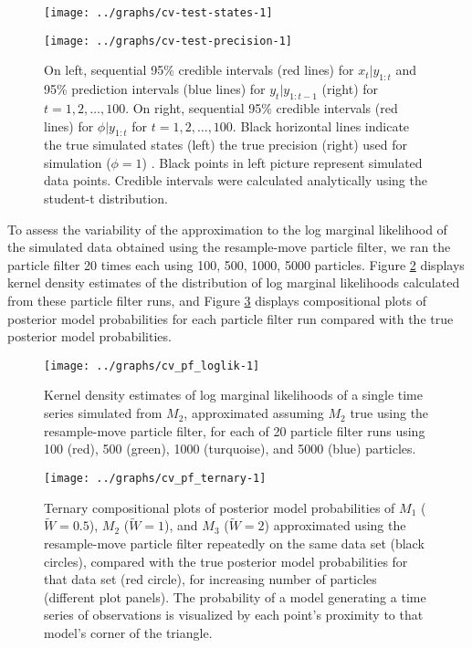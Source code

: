 \documentclass{article}
\begin{document}
\begin{figure}
\begin{minipage}{0.5\textwidth}
\texttt{[image: ../graphs/cv-test-states-1]}
\end{minipage}
\begin{minipage}{0.5\textwidth}
\texttt{[image: ../graphs/cv-test-precision-1]}
\end{minipage}
\caption{On left, sequential 95\% credible intervals (red lines) for $x_t|y_{1:t}$ and 95\% prediction intervals (blue lines) for $y_t|y_{1:t-1}$ (right) for $t = 1, 2, \ldots, 100$. On right, sequential 95\% credible intervals (red lines) for $\phi|y_{1:t}$ for $t = 1, 2, \ldots, 100$. Black horizontal lines indicate the true simulated states (left) the true precision (right) used for simulation ($\phi = 1$) . Black points in left picture represent simulated data points. Credible intervals were calculated analytically using the student-t distribution.} \label{fig:sim}
\end{figure}

To assess the variability of the approximation to the log marginal likelihood of the simulated data obtained using the resample-move particle filter, we ran the particle filter 20 times each using 100, 500, 1000, 5000 particles. Figure \ref{fig:pf-hist} displays kernel density estimates of the distribution of log marginal likelihoods calculated from these particle filter runs, and Figure \ref{fig:pf-1sim-ternary} displays compositional plots of posterior model probabilities for each particle filter run compared with the true posterior model probabilities.

\begin{figure}
\texttt{[image: ../graphs/cv\_pf\_loglik-1]}
\caption{Kernel density estimates of log marginal likelihoods of a single time series simulated from $M_2$, approximated assuming $M_2$ true using the resample-move particle filter, for each of 20 particle filter runs using 100 (red), 500 (green), 1000 (turquoise), and 5000 (blue) particles.} \label{fig:pf-hist}
\end{figure}

\begin{figure}
\texttt{[image: ../graphs/cv\_pf\_ternary-1]}
\caption{Ternary compositional plots of posterior model probabilities of $M_1$ ($\tilde{W} = 0.5$), $M_2$ ($\tilde{W} = 1$), and $M_3$ ($\tilde{W} = 2$) approximated using the resample-move particle filter repeatedly on the same data set (black circles), compared with the true posterior model probabilities for that data set (red circle), for increasing number of particles (different plot panels). The probability of a model generating a time series of observations is visualized by each point's proximity to that model's corner of the triangle.} \label{fig:pf-1sim-ternary}
\end{figure}
\end{document}
